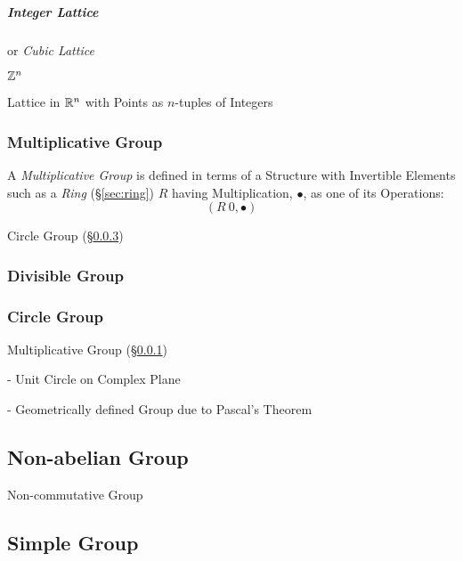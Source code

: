 \subparagraph{Integer Lattice}\label{sec:integer_lattice}\hfill

or \emph{Cubic Lattice}

$\mathbb{Z}^n$

Lattice in $\mathbb{R}^n$ with Points as $n$-tuples of Integers



\subsubsection{Multiplicative Group}\label{sec:multiplicative_group}

A \emph{Multiplicative Group} is defined in terms of a Structure with
Invertible Elements such as a \emph{Ring} (\S\ref{sec:ring}) $R$
having Multiplication, $\bullet$, as one of its Operations:
\[
  (R \ {0}, \bullet)
\]

Circle Group (\S\ref{sec:circle_group})



\subsubsection{Divisible Group}\label{sec:divisible_group}

\subsubsection{Circle Group}\label{sec:circle_group}

Multiplicative Group (\S\ref{sec:multiplicative_group})

- Unit Circle on Complex Plane

- Geometrically defined Group due to Pascal's Theorem
  \cite{lemmermeyer-shirali09}



\subsection{Non-abelian Group}\label{sec:noncommutative_group}

Non-commutative Group



\subsection{Simple Group}\label{sec:simple_group}

